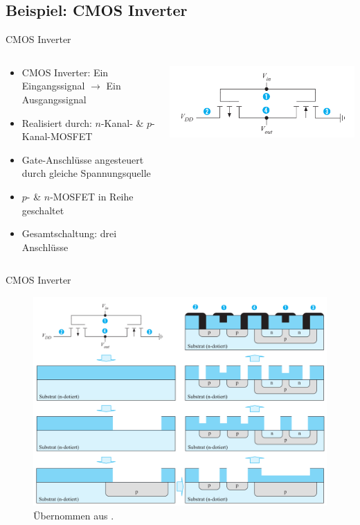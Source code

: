 \documentclass[12pt%
,aspectratio=169%
]{beamer}
\begin{document}
\subsection{Beispiel: CMOS Inverter}
\begin{frame}{CMOS Inverter}
\begin{columns}[T] %
\begin{column}{.58\textwidth}
\begin{itemize}
	\item CMOS Inverter: Ein Eingangssignal $\to$ Ein Ausgangssignal
	\item Realisiert durch: $n$-Kanal- \& $p$-Kanal-MOSFET
	\item Gate-Anschlüsse angesteuert durch gleiche Spannungsquelle
	\item $p$- \& $n$-MOSFET in Reihe geschaltet
	\item Gesamtschaltung: drei Anschlüsse
\end{itemize}
\end{column}%
\hfill%
\begin{column}{.38\textwidth}
\centering
\includegraphics[scale=0.35]{pictures/inverter_shaltung}
\end{column}%
\end{columns}
\end{frame}

\begin{frame}{CMOS Inverter}
\begin{figure}
\center
\includegraphics[scale=0.3]{pictures/cmos_inverter}
\caption{Übernommen aus \cite{hoffmann2020grundlagen}.}
\end{figure}
\end{frame}
\end{document}
